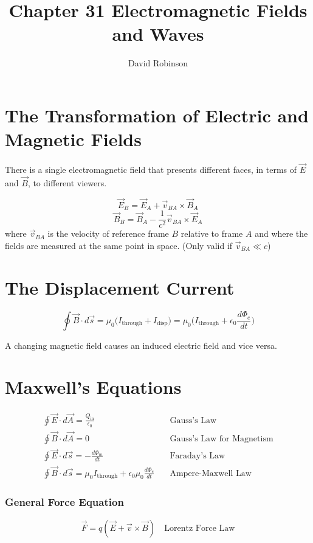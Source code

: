 \documentclass{article}
\title{Chapter 31 Electromagnetic Fields and Waves}
\author{David Robinson}
\date{}
\begin{document}
\maketitle

\section*{The Transformation of Electric and Magnetic Fields}
There is a single electromagnetic field that presents different faces, in terms of $\vec{E}$ and
$\vec{B}$, to different viewers.

\[\vec{E}_B = \vec{E}_A + \vec{v}_{BA}\times \vec{B}_A\]
\[\vec{B}_B = \vec{B}_A - \frac{1}{c^2}\vec{v}_{BA}\times \vec{E}_A\]
where $\vec{v}_{BA}$ is the velocity of reference frame $B$ relative to frame $A$ and where the
fields are measured at the same point in space. (Only valid if $\vec{v}_{BA} \ll c$)

\section*{The Displacement Current}
\[\oint\vec{B}\cdot d \vec{s}=\mu_0 \Big(I_\text{through} + I_\text{disp}\Big) = \mu_0
\Big(I_\text{through} + \epsilon_0 \frac{d\Phi _ e}{dt}\Big)\]

A changing magnetic field causes an induced electric field and vice versa.

\pagebreak

\section*{Maxwell's Equations}
\[\begin{aligned}
    \oint\vec{E}\cdot d\vec{A}=\frac{Q_\text{in}}{\epsilon_0}\quad & \text{Gauss's Law} \\ 
    \oint\vec{B}\cdot d\vec{A}=0\quad & \text{Gauss's Law for Magnetism} \\
    \oint\vec{E}\cdot d\vec{s} = -\frac{d\Phi_m}{dt}\quad & \text{Faraday's Law} \\ 
    \oint\vec{B}\cdot d\vec{s} = \mu_0 I_\text{through} + \epsilon_0 \mu_0 \frac{d\Phi_e}{dt}\quad
    & \text{Ampere-Maxwell Law}
\end{aligned}\]

\subsubsection*{General Force Equation}
\[\vec{F}=q(\vec{E} + \vec{v} \times \vec{B})\quad\text{Lorentz Force Law}\]
\end{document}
